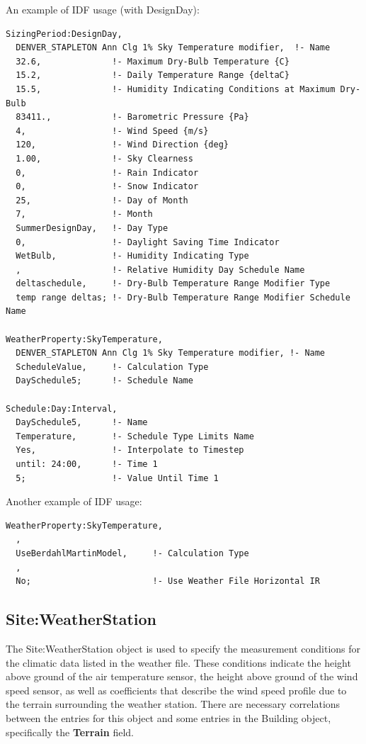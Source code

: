 An example of IDF usage (with DesignDay):

\begin{lstlisting}
SizingPeriod:DesignDay,
  DENVER_STAPLETON Ann Clg 1% Sky Temperature modifier,  !- Name
  32.6,              !- Maximum Dry-Bulb Temperature {C}
  15.2,              !- Daily Temperature Range {deltaC}
  15.5,              !- Humidity Indicating Conditions at Maximum Dry-Bulb
  83411.,            !- Barometric Pressure {Pa}
  4,                 !- Wind Speed {m/s}
  120,               !- Wind Direction {deg}
  1.00,              !- Sky Clearness
  0,                 !- Rain Indicator
  0,                 !- Snow Indicator
  25,                !- Day of Month
  7,                 !- Month
  SummerDesignDay,   !- Day Type
  0,                 !- Daylight Saving Time Indicator
  WetBulb,           !- Humidity Indicating Type
  ,                  !- Relative Humidity Day Schedule Name
  deltaschedule,     !- Dry-Bulb Temperature Range Modifier Type
  temp range deltas; !- Dry-Bulb Temperature Range Modifier Schedule Name

WeatherProperty:SkyTemperature,
  DENVER_STAPLETON Ann Clg 1% Sky Temperature modifier, !- Name
  ScheduleValue,     !- Calculation Type
  DaySchedule5;      !- Schedule Name

Schedule:Day:Interval,
  DaySchedule5,      !- Name
  Temperature,       !- Schedule Type Limits Name
  Yes,               !- Interpolate to Timestep
  until: 24:00,      !- Time 1
  5;                 !- Value Until Time 1
\end{lstlisting}

Another example of IDF usage:

\begin{lstlisting}
WeatherProperty:SkyTemperature,
  ,
  UseBerdahlMartinModel,     !- Calculation Type
  ,
  No;                        !- Use Weather File Horizontal IR
\end{lstlisting}


\subsection{Site:WeatherStation}\label{siteweatherstation}

The Site:WeatherStation object is used to specify the measurement conditions for the climatic data listed in the weather file. These conditions indicate the height above ground of the air temperature sensor, the height above ground of the wind speed sensor, as well as coefficients that describe the wind speed profile due to the terrain surrounding the weather station. There are necessary correlations between the entries for this object and some entries in the Building object, specifically the \textbf{Terrain} field.

